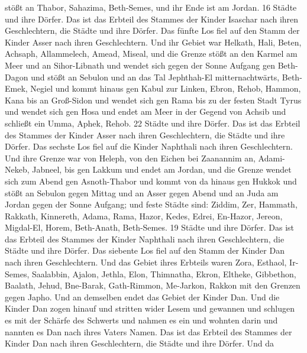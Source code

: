 stößt an Thabor, Sahazima, Beth-Semes, und ihr Ende ist am Jordan. 16
Städte und ihre Dörfer.  Das ist das Erbteil des Stammes
der Kinder Isaschar nach ihren Geschlechtern, die Städte und ihre
Dörfer.  Das fünfte Los fiel auf den Stamm der Kinder Asser
nach ihren Geschlechtern.  Und ihr Gebiet war Helkath,
Hali, Beten, Achsaph,  Allammelech, Amead, Miseal, und die
Grenze stößt an den Karmel am Meer und an Sihor-Libnath 
und wendet sich gegen der Sonne Aufgang gen Beth-Dagon und stößt an
Sebulon und an das Tal Jephthah-El mitternachtwärts, Beth-Emek, Negiel
und kommt hinaus gen Kabul zur Linken,  Ebron, Rehob,
Hammon, Kana bis an Groß-Sidon  und wendet sich gen Rama
bis zu der festen Stadt Tyrus und wendet sich gen Hosa und endet am Meer
in der Gegend von Achsib  und schließt ein Umma, Aphek,
Rehob. 22 Städte und ihre Dörfer.  Das ist das Erbteil des
Stammes der Kinder Asser nach ihren Geschlechtern, die Städte und ihre
Dörfer.  Das sechste Los fiel auf die Kinder Naphthali nach
ihren Geschlechtern.  Und ihre Grenze war von Heleph, von
den Eichen bei Zaanannim an, Adami-Nekeb, Jabneel, bis gen Lakkum und
endet am Jordan,  und die Grenze wendet sich zum Abend gen
Asnoth-Thabor und kommt von da hinaus gen Hukkok und stößt an Sebulon
gegen Mittag und an Asser gegen Abend und an Juda am Jordan gegen der
Sonne Aufgang;  und feste Städte sind: Ziddim, Zer,
Hammath, Rakkath, Kinnereth,  Adama, Rama, Hazor,
 Kedes, Edrei, En-Hazor,  Jereon, Migdal-El,
Horem, Beth-Anath, Beth-Semes. 19 Städte und ihre Dörfer. 
Das ist das Erbteil des Stammes der Kinder Naphthali nach ihren
Geschlechtern, die Städte und ihre Dörfer.  Das siebente
Los fiel auf den Stamm der Kinder Dan nach ihren Geschlechtern.
 Und das Gebiet ihres Erbteils waren Zora, Esthaol,
Ir-Semes,  Saalabbin, Ajalon, Jethla,  Elon,
Thimnatha, Ekron,  Eltheke, Gibbethon, Baalath,
 Jehud, Bne-Barak, Gath-Rimmon,  Me-Jarkon,
Rakkon mit den Grenzen gegen Japho.  Und an demselben endet
das Gebiet der Kinder Dan. Und die Kinder Dan zogen hinauf und stritten
wider Lesem und gewannen und schlugen es mit der Schärfe des Schwerts
und nahmen es ein und wohnten darin und nannten es Dan nach ihres Vaters
Namen.  Das ist das Erbteil des Stammes der Kinder Dan nach
ihren Geschlechtern, die Städte und ihre Dörfer.  Und da
